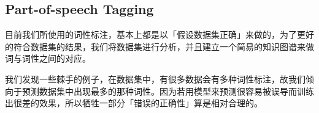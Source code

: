 
\subsection{Part-of-speech Tagging}
\label{sec:pos}

目前我们所使用的词性标注，基本上都是以「假设数据集正确」来做的，为了更好的符合数据集的结果，我们将数据集进行分析，并且建立一个简易的知识图谱来做词与词性之间的对应。

我们发现一些棘手的例子，在数据集中，有很多数据会有多种词性标注，故我们倾向于预测数据集中出现最多的那种词性。因为若用模型来预测很容易被误导而训练出很差的效果，所以牺牲一部分「错误的正确性」算是相对合理的。
